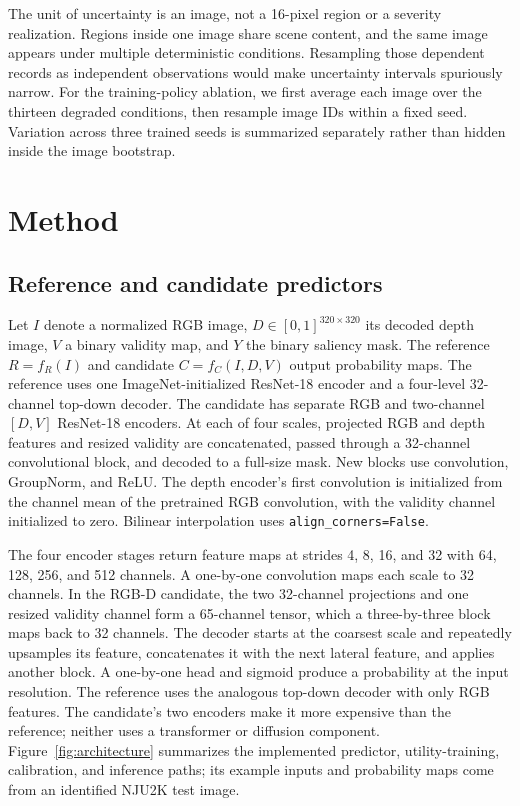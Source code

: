 \documentclass[11pt]{article}
\begin{document}
The unit of uncertainty is an image, not a 16-pixel region or a severity realization. Regions inside one image share scene content, and the same image appears under multiple deterministic conditions. Resampling those dependent records as independent observations would make uncertainty intervals spuriously narrow. For the training-policy ablation, we first average each image over the thirteen degraded conditions, then resample image IDs within a fixed seed. Variation across three trained seeds is summarized separately rather than hidden inside the image bootstrap.

\section{Method}
\subsection{Reference and candidate predictors}
Let $I$ denote a normalized RGB image, $D\in[0,1]^{320\times320}$ its decoded depth image, $V$ a binary validity map, and $Y$ the binary saliency mask. The reference $R=f_R(I)$ and candidate $C=f_C(I,D,V)$ output probability maps. The reference uses one ImageNet-initialized ResNet-18 encoder \cite{resnet} and a four-level 32-channel top-down decoder. The candidate has separate RGB and two-channel $[D,V]$ ResNet-18 encoders. At each of four scales, projected RGB and depth features and resized validity are concatenated, passed through a 32-channel convolutional block, and decoded to a full-size mask. New blocks use convolution, GroupNorm, and ReLU. The depth encoder's first convolution is initialized from the channel mean of the pretrained RGB convolution, with the validity channel initialized to zero. Bilinear interpolation uses \texttt{align\_corners=False}.

The four encoder stages return feature maps at strides 4, 8, 16, and 32 with 64, 128, 256, and 512 channels. A one-by-one convolution maps each scale to 32 channels. In the RGB-D candidate, the two 32-channel projections and one resized validity channel form a 65-channel tensor, which a three-by-three block maps back to 32 channels. The decoder starts at the coarsest scale and repeatedly upsamples its feature, concatenates it with the next lateral feature, and applies another block. A one-by-one head and sigmoid produce a probability at the input resolution. The reference uses the analogous top-down decoder with only RGB features. The candidate's two encoders make it more expensive than the reference; neither uses a transformer or diffusion component. Figure~\ref{fig:architecture} summarizes the implemented predictor, utility-training, calibration, and inference paths; its example inputs and probability maps come from an identified NJU2K test image.
\end{document}
